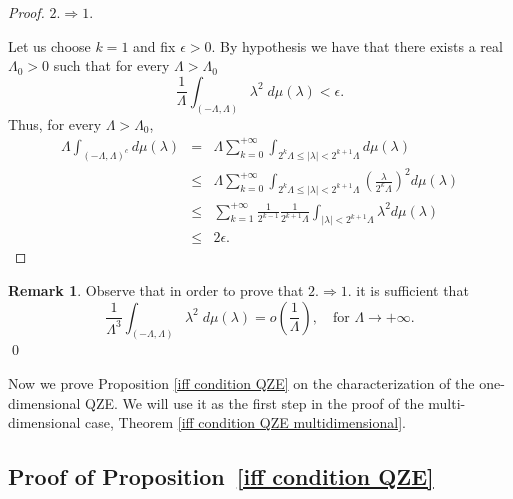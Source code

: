 \documentclass[aip,jmp
]{revtex4}
\theoremstyle{definition}
\newtheorem{remark}{Remark}
\begin{document}
\begin{proof}
$2. \Rightarrow 1.$

Let us choose $k=1$ and fix $\epsilon >0$. By hypothesis we have that there exists a real $\Lambda_{0}>0$ such that for every $\Lambda>\Lambda_{0}$
$$
\frac{1}{\Lambda}\int_{(-\Lambda,\Lambda)} \lambda^2 \; d\mu(\lambda) <\epsilon.
$$
Thus, for every $\Lambda>\Lambda_{0}$,
\begin{eqnarray*}
\Lambda\int_{(-\Lambda,\Lambda)^c} d\mu(\lambda) & = & \Lambda \sum_{k=0}^{+\infty} \int_{2^{k}\Lambda \leq |\lambda| < 2^{k+1}\Lambda} d\mu(\lambda) \\
& \leq & \Lambda \sum_{k=0}^{+\infty}   \int_{2^{k}\Lambda \leq |\lambda| < 2^{k+1}\Lambda} \left(\frac{\lambda}{2^{k}\Lambda}\right)^2 d\mu(\lambda) \\
                                                    & \leq & \sum_{k=1}^{+\infty} \frac{1}{2^{k-1}} \frac{1}{2^{k+1}\Lambda} \int_{|\lambda| < 2^{k+1}\Lambda } \lambda^2 d\mu(\lambda) \\
                                               & \leq &  2\epsilon .
\end{eqnarray*}
\end{proof}

\begin{remark}
\label{only k}
Observe that in order to prove that $2. \Rightarrow 1.$ it is sufficient that
$$
\frac{1}{\Lambda^3}\int_{(-\Lambda,\Lambda)} \lambda^{2}\; d\mu(\lambda) = o\left( \frac{1}{\Lambda} \right), \quad \textrm{for $\Lambda \to + \infty$}.
$$
\qed
\end{remark}

Now we prove  Proposition \ref{iff condition QZE} on the characterization of the one-dimensional QZE. We will use it as the first step in the proof of the multi-dimensional case, Theorem \ref{iff condition QZE multidimensional}.




\subsection*{Proof of Proposition~\ref {iff condition QZE}}
\end{document}
